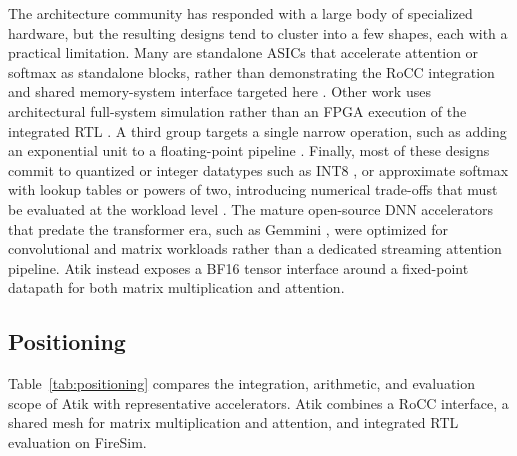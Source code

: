 \documentclass[sigconf,nonacm]{acmart}
\begin{document}
The architecture community has responded with a large body of specialized
hardware, but the resulting designs tend to cluster into a few shapes, each
with a practical limitation. Many are standalone ASICs that accelerate
attention or softmax as standalone blocks, rather than demonstrating the
RoCC integration and shared memory-system interface targeted here
\cite{a3,elsa,sanger,energon}. Other work uses architectural full-system
simulation rather than an FPGA execution of the integrated RTL
\cite{ticsat}. A third group targets a single narrow
operation, such as adding an exponential unit to a floating-point pipeline
\cite{vexp}. Finally, most of these designs commit to quantized or integer
datatypes such as INT8 \cite{ita,swiftron}, or approximate softmax with
lookup tables or powers of two, introducing numerical trade-offs that must be
evaluated at the workload level \cite{softermax,sole}. The mature open-source
DNN accelerators that predate the
transformer era, such as Gemmini \cite{gemmini}, were optimized for
convolutional and matrix workloads rather than a dedicated streaming attention
pipeline. Atik instead exposes a BF16 tensor interface around a fixed-point
datapath for both matrix multiplication and attention.

\subsection{Positioning}
Table~\ref{tab:positioning} compares the integration, arithmetic, and evaluation
scope of Atik with representative accelerators. Atik combines a RoCC interface,
a shared mesh for matrix multiplication and attention, and integrated RTL
evaluation on FireSim.
\end{document}
